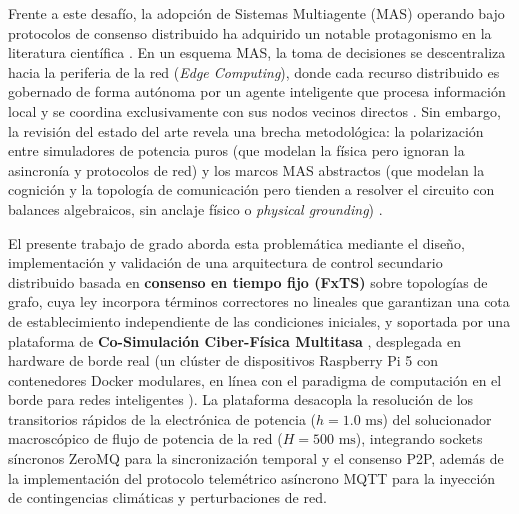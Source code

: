 Frente a este desafío, la adopción de Sistemas Multiagente (MAS) operando bajo protocolos de consenso distribuido ha adquirido un notable protagonismo en la literatura científica \citep{Mamun2026, Altin2023MultiAgent}. En un esquema MAS, la toma de decisiones se descentraliza hacia la periferia de la red (\textit{Edge Computing}), donde cada recurso distribuido es gobernado de forma autónoma por un agente inteligente que procesa información local y se coordina exclusivamente con sus nodos vecinos directos \citep{Diaz2025, AlvarezLopez2026}. Sin embargo, la revisión del estado del arte revela una brecha metodológica: la polarización entre simuladores de potencia puros (que modelan la física pero ignoran la asincronía y protocolos de red) y los marcos MAS abstractos (que modelan la cognición y la topología de comunicación pero tienden a resolver el circuito con balances algebraicos, sin anclaje físico o \textit{physical grounding}) \citep{Muszynski2026EnergyTwin, Khanna2025}.

El presente trabajo de grado aborda esta problemática mediante el diseño, implementación y validación de una arquitectura de control secundario distribuido basada en \textbf{consenso en tiempo fijo (FxTS)} sobre topologías de grafo, cuya ley incorpora términos correctores no lineales que garantizan una cota de establecimiento independiente de las condiciones iniciales, y soportada por una plataforma de \textbf{Co-Simulación Ciber-Física Multitasa} \citep{Gomes2022FMI30, Liu2025Multirate}, desplegada en hardware de borde real (un clúster de dispositivos Raspberry Pi 5 con contenedores Docker modulares, en línea con el paradigma de computación en el borde para redes inteligentes \citep{Mehmood2021}). La plataforma desacopla la resolución de los transitorios rápidos de la electrónica de potencia ($h = 1.0\text{ ms}$) del solucionador macroscópico de flujo de potencia de la red ($H = 500\text{ ms}$), integrando sockets síncronos ZeroMQ para la sincronización temporal y el consenso P2P, además de la implementación del protocolo telemétrico asíncrono MQTT para la inyección de contingencias climáticas y perturbaciones de red.

